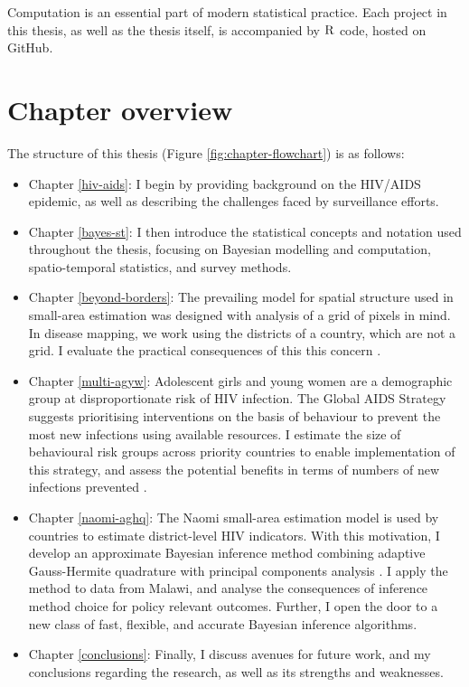 \documentclass[a4paper, nobind]{templates/ociamthesis}
\providecommand{\tightlist}{%
  \setlength{\itemsep}{0pt}\setlength{\parskip}{0pt}}
\begin{document}
Computation is an essential part of modern statistical practice.
Each project in this thesis, as well as the thesis itself, is accompanied by \(\textsc{R}\) code, hosted on GitHub.

\hypertarget{chapter-overview}{%
\section{Chapter overview}\label{chapter-overview}}

The structure of this thesis (Figure \ref{fig:chapter-flowchart}) is as follows:

\begin{itemize}
\tightlist
\item
  Chapter \ref{hiv-aids}: I begin by providing background on the HIV/AIDS epidemic, as well as describing the challenges faced by surveillance efforts.
\item
  Chapter \ref{bayes-st}: I then introduce the statistical concepts and notation used throughout the thesis, focusing on Bayesian modelling and computation, spatio-temporal statistics, and survey methods.
\item
  Chapter \ref{beyond-borders}: The prevailing model for spatial structure used in small-area estimation \autocite{besag1991bayesian} was designed with analysis of a grid of pixels in mind.
  In disease mapping, we work using the districts of a country, which are not a grid.
  I evaluate the practical consequences of this this concern \autocite{howes2023beyond}.
\item
  Chapter \ref{multi-agyw}: Adolescent girls and young women are a demographic group at disproportionate risk of HIV infection.
  The Global AIDS Strategy suggests prioritising interventions on the basis of behaviour to prevent the most new infections using available resources.
  I estimate the size of behavioural risk groups across priority countries to enable implementation of this strategy, and assess the potential benefits in terms of numbers of new infections prevented \autocite{howes2023spatio}.
\item
  Chapter \ref{naomi-aghq}: The Naomi small-area estimation model \autocite{eaton2021naomi} is used by countries to estimate district-level HIV indicators.
  With this motivation, I develop an approximate Bayesian inference method combining adaptive Gauss-Hermite quadrature with principal components analysis \autocite{howes2023fast}.
  I apply the method to data from Malawi, and analyse the consequences of inference method choice for policy relevant outcomes.
  Further, I open the door to a new class of fast, flexible, and accurate Bayesian inference algorithms.
\item
  Chapter \ref{conclusions}: Finally, I discuss avenues for future work, and my conclusions regarding the research, as well as its strengths and weaknesses.
\end{itemize}
\end{document}
